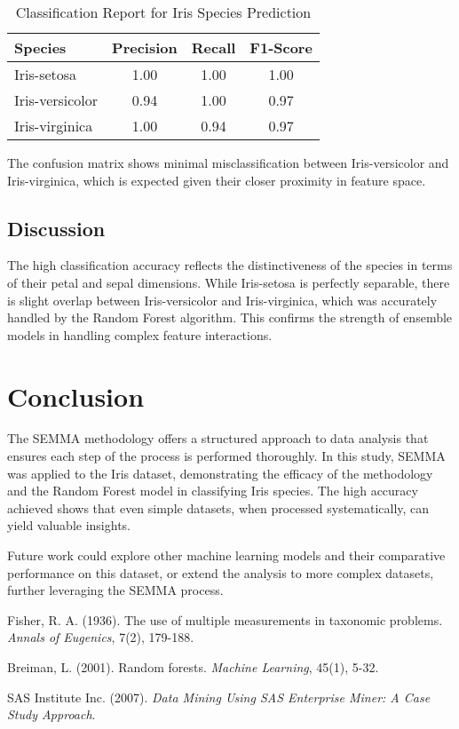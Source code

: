 \documentclass{article}
\begin{document}
\begin{table}[h]
\centering
\caption{Classification Report for Iris Species Prediction}
\label{tab:performance}
\begin{tabular}{lccc}
\toprule
Species        & Precision & Recall & F1-Score \\
\midrule
Iris-setosa    & 1.00      & 1.00   & 1.00     \\
Iris-versicolor& 0.94      & 1.00   & 0.97     \\
Iris-virginica & 1.00      & 0.94   & 0.97     \\
\bottomrule
\end{tabular}
\end{table}

The confusion matrix shows minimal misclassification between Iris-versicolor and Iris-virginica, which is expected given their closer proximity in feature space.

\subsection{Discussion}
The high classification accuracy reflects the distinctiveness of the species in terms of their petal and sepal dimensions. While Iris-setosa is perfectly separable, there is slight overlap between Iris-versicolor and Iris-virginica, which was accurately handled by the Random Forest algorithm. This confirms the strength of ensemble models in handling complex feature interactions.

\section{Conclusion}
The SEMMA methodology offers a structured approach to data analysis that ensures each step of the process is performed thoroughly. In this study, SEMMA was applied to the Iris dataset, demonstrating the efficacy of the methodology and the Random Forest model in classifying Iris species. The high accuracy achieved shows that even simple datasets, when processed systematically, can yield valuable insights.

Future work could explore other machine learning models and their comparative performance on this dataset, or extend the analysis to more complex datasets, further leveraging the SEMMA process.

\begin{thebibliography}{9}
Fisher, R. A. (1936). The use of multiple measurements in taxonomic problems. \textit{Annals of Eugenics}, 7(2), 179-188.

Breiman, L. (2001). Random forests. \textit{Machine Learning}, 45(1), 5-32.

SAS Institute Inc. (2007). \textit{Data Mining Using SAS Enterprise Miner: A Case Study Approach}.
\end{thebibliography}
\end{document}
